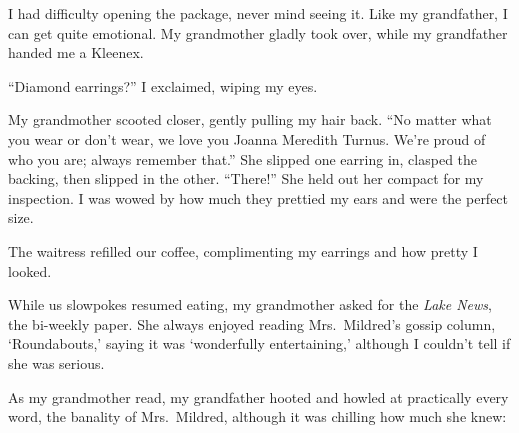 I had difficulty opening the package, never mind seeing it. Like my
grandfather, I can get quite emotional. My grandmother gladly took over,
while my grandfather handed me a Kleenex.

``Diamond earrings?'' I exclaimed, wiping my eyes.

My grandmother scooted closer, gently pulling my hair back. ``No matter
what you wear or don't wear, we love you Joanna Meredith Turnus. We're
proud of who you are; always remember that.'' She slipped one earring
in, clasped the backing, then slipped in the other. ``There!'' She held
out her compact for my inspection. I was wowed by how much they prettied
my ears and were the perfect size.

The waitress refilled our coffee, complimenting my earrings and how
pretty I looked.

While us slowpokes resumed eating, my grandmother asked for the
\emph{Lake News}, the bi-weekly paper. She always enjoyed reading
Mrs.~Mildred's gossip column, `Roundabouts,' saying it was `wonderfully
entertaining,' although I couldn't tell if she was serious.

As my grandmother read, my grandfather hooted and howled at practically
every word, the banality of Mrs.~Mildred, although it was chilling how
much she knew:

